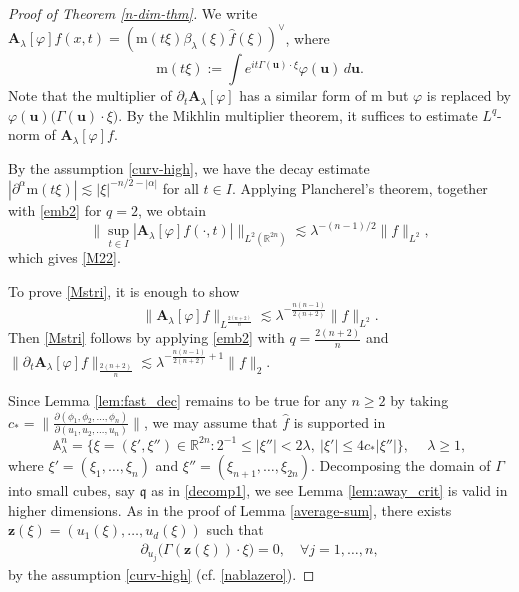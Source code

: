 \documentclass[10pt] %
{amsart}
\theoremstyle{plain}
\numberwithin{equation}{section}
\newcommand{\fq}{\mathfrak q}
\begin{document}
\begin{proof}[Proof of Theorem \ref{n-dim-thm}]
We write $\mathbf A_\lambda[\varphi]f (x,t) = (\mathrm m(t\xi) \beta_\lambda(\xi)\widehat f(\xi))^\vee$, where  
\[
  \mathrm m ( t\xi)   :=  \int e^{i t \Gamma(\mathbf u)\cdot \xi} \varphi(\mathbf u)\,d\mathbf u .
\]
Note that the multiplier of $\partial_t \mathbf A_\lambda[\varphi]$ has a similar form of $\mathrm m$ but $\varphi$ is replaced by $\varphi(\mathbf u)\big(\Gamma(\mathbf u)\cdot \xi\big)$. By the Mikhlin multiplier theorem, it suffices to estimate $L^q$-norm of $\mathbf A_\lambda[\varphi]f$. 

By the assumption \eqref{curv-high}, we have  the decay estimate $|\partial^\alpha \mathrm m (t\xi)| \lesssim |\xi|^{-n/2-|\alpha|}$ for all $t\in I$. 
Applying Plancherel's theorem, together with \eqref{emb2} for $q=2$, we obtain
\[
\| \sup_{t\in I} |\mathbf A_\lambda[\varphi]f(\cdot,t)| \|_{L^2(\mathbb R^{2n})}\lesssim \lambda^{-(n-1)/2} \| f\|_{L^2},
\]
which gives \eqref{M22}. 



To prove \eqref{Mstri}, it is enough to show
\begin{equation}\label{Stri}
\|   \mathbf A_\lambda[\varphi]f\|_{L^{\frac{2(n+2)}{n}}} \lesssim \lambda^{-\frac{n(n-1)}{2(n+2)}} \|f\|_{L^2} . 
\end{equation}
Then \eqref{Mstri} follows by applying \eqref{emb2} with $q = \frac{2(n+2)}{n}$  and  $\|  \partial_t \mathbf A_\lambda[\varphi]f\|_{\frac{2(n+2)}{n}} \lesssim \lambda^{-\frac{n(n-1)}{2(n+2)} + 1} \|f\|_{2}$.

Since Lemma \ref{lem:fast_dec} remains to be true for any $n\ge 2$ by taking $c_\ast = \| \frac{\partial(\phi_1,\phi_2,\dots,\phi_n)}{\partial(u_1,u_2,\dots,u_n)}\|$, we may assume that $\widehat{f }$ is supported in 
\[
\mathbb A_\lambda^n = \{ \xi=(\xi',\xi'') \in \mathbb R^{2n}:2^{-1}\le |\xi''| <2\lambda, ~ |\xi'|\le 4c_\ast|\xi''| \},~\quad \lambda \ge 1 ,
\]
where $\xi'=(\xi_1,\dots,\xi_n)$ and $\xi''=(\xi_{n+1},\dots,\xi_{2n})$. 
Decomposing the domain of $\Gamma$ into small cubes, say $\fq$ as in \eqref{decomp1}, we see Lemma \ref{lem:away_crit} is valid in higher dimensions. 
As in the proof of Lemma \ref{average-sum}, there exists $\mathbf z(\xi) = (u_1(\xi), \dots, u_d(\xi))$ such that 
\begin{align*}
\partial_{u_j}\big( \Gamma( \mathbf z(\xi) ) \cdot \xi   \big) = 0, \quad \forall j=1,\dots,n ,
\end{align*}
by the assumption \eqref{curv-high} (cf. \eqref{nablazero}).



\end{proof}
\end{document}
